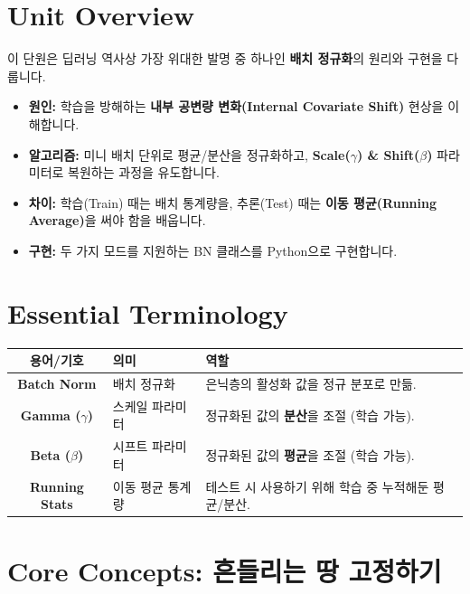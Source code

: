 \documentclass[11pt,a4paper]{book}
\theoremstyle{definition}
\begin{document}
\section{Unit Overview}
\begin{summarybox}[title={핵심 목표}]
이 단원은 딥러닝 역사상 가장 위대한 발명 중 하나인 \textbf{배치 정규화}의 원리와 구현을 다룹니다.
\begin{itemize}
    \item \textbf{원인:} 학습을 방해하는 \textbf{내부 공변량 변화(Internal Covariate Shift)} 현상을 이해합니다.
    \item \textbf{알고리즘:} 미니 배치 단위로 평균/분산을 정규화하고, \textbf{Scale($\gamma$) \& Shift($\beta$)} 파라미터로 복원하는 과정을 유도합니다.
    \item \textbf{차이:} 학습(Train) 때는 배치 통계량을, 추론(Test) 때는 \textbf{이동 평균(Running Average)}을 써야 함을 배웁니다.
    \item \textbf{구현:} 두 가지 모드를 지원하는 BN 클래스를 Python으로 구현합니다.
\end{itemize}
\end{summarybox}

\section{Essential Terminology}
\begin{center}
\begin{tabular}{|c|l|l|}
\hline
\textbf{용어/기호} & \textbf{의미} & \textbf{역할} \\ \hline
\textbf{Batch Norm} & 배치 정규화 & 은닉층의 활성화 값을 정규 분포로 만듦. \\ \hline
\textbf{Gamma ($\gamma$)} & 스케일 파라미터 & 정규화된 값의 \textbf{분산}을 조절 (학습 가능). \\ \hline
\textbf{Beta ($\beta$)} & 시프트 파라미터 & 정규화된 값의 \textbf{평균}을 조절 (학습 가능). \\ \hline
\textbf{Running Stats} & 이동 평균 통계량 & 테스트 시 사용하기 위해 학습 중 누적해둔 평균/분산. \\ \hline
\end{tabular}
\end{center}

\section{Core Concepts: 흔들리는 땅 고정하기}
\end{document}
